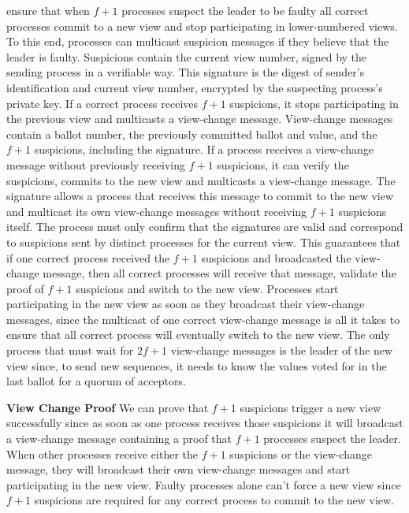  ensure that when $f+1$ processes suspect the leader to be faulty all correct processes commit to a new view and stop participating in lower-numbered views. To this end, processes can multicast suspicion messages if they believe that the leader is faulty. Suspicions contain the current view number, signed by the sending process in a verifiable way. This signature is the digest of sender's identification and current view number, encrypted by the suspecting process's private key. If a correct process receives $f+1$ suspicions, it stops participating in the previous view and multicasts a view-change message. View-change messages contain a ballot number, the previously committed ballot and value, and the $f+1$ suspicions, including the signature. If a process receives a view-change message without previously receiving $f+1$ suspicions, it can verify the suspicions, commits to the new view and multicasts a view-change message. The signature allows a process that receives this message to commit to the new view and multicast its own view-change messages without receiving $f+1$ suspicions itself. The process must only confirm that the signatures are valid and correspond to suspicions sent by distinct processes for the current view. This guarantees that if one correct process received the $f+1$ suspicions and broadcasted the view-change message, then all correct processes will receive that message, validate the proof of $f+1$ suspicions and switch to the new view. Processes start participating in the new view as soon as they broadcast their view-change messages, since the multicast of one correct view-change message is all it takes to ensure that all correct process will eventually switch to the new view. The only process that must wait for $2f+1$ view-change messages is the leader of the new view since, to send new sequences, it needs to know the values voted for in the last ballot for a quorum of acceptors. \par
\textbf{View Change Proof} We can prove that $f+1$ suspicions trigger a new view successfully since as soon as one process receives those suspicions it will broadcast a view-change message containing a proof that $f+1$ processes suspect the leader. When other processes receive either the $f+1$ suspicions or the view-change message, they will broadcast their own view-change messages and start participating in the new view. Faulty processes alone can't force a new view since $f+1$ suspicions are required for any correct process to commit to the new view.\par

